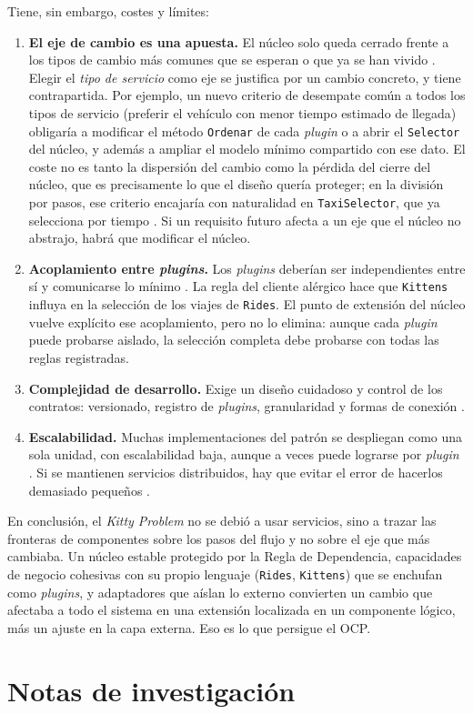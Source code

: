Tiene, sin embargo, costes y límites:
\begin{enumerate}[label=(\arabic*)]
  \item \textbf{El eje de cambio es una apuesta.} El núcleo solo queda cerrado frente a
        los tipos de cambio más comunes que se esperan o que ya se han vivido
        \parencite[106]{martin2017}. Elegir el \emph{tipo de servicio} como eje se justifica
        por un cambio concreto, y tiene contrapartida. Por ejemplo, un nuevo criterio de
        desempate común a todos los tipos de servicio (preferir el vehículo con menor
        tiempo estimado de llegada) obligaría a modificar el método \texttt{Ordenar} de
        cada \emph{plugin} o a abrir el \texttt{Selector} del núcleo, y además a ampliar
        el modelo mínimo compartido con ese dato. El coste no es tanto la dispersión del
        cambio como la pérdida del cierre del núcleo, que es precisamente lo que el
        diseño quería proteger; en la división por pasos, ese criterio encajaría con
        naturalidad en \texttt{TaxiSelector}, que ya selecciona por tiempo
        \parencite[242]{martin2017}. Si un requisito futuro afecta a un eje que el núcleo
        no abstrajo, habrá que modificar el núcleo.
  \item \textbf{Acoplamiento entre \emph{plugins}.} Los \emph{plugins} deberían ser
        independientes entre sí y comunicarse lo mínimo \parencite[22]{richards2015}. La
        regla del cliente alérgico hace que \texttt{Kittens} influya en la selección de
        los viajes de \texttt{Rides}. El punto de extensión del núcleo vuelve explícito
        ese acoplamiento, pero no lo elimina: aunque cada \emph{plugin} puede probarse
        aislado, la selección completa debe probarse con todas las reglas registradas.
  \item \textbf{Complejidad de desarrollo.} Exige un diseño cuidadoso y control de los
        contratos: versionado, registro de \emph{plugins}, granularidad y formas de
        conexión \parencite[26]{richards2015}.
  \item \textbf{Escalabilidad.} Muchas implementaciones del patrón se despliegan como una
        sola unidad, con escalabilidad baja, aunque a veces puede lograrse por
        \emph{plugin} \parencite[26]{richards2015}. Si se mantienen servicios
        distribuidos, hay que evitar el error de hacerlos demasiado pequeños
        \parencite[cap.~17]{richardsford2020}.
\end{enumerate}

En conclusión, el \emph{Kitty Problem} no se debió a usar servicios, sino a trazar las
fronteras de componentes sobre los pasos del flujo y no sobre el eje que más cambiaba. Un
núcleo estable protegido por la Regla de Dependencia, capacidades de negocio cohesivas
con su propio lenguaje (\texttt{Rides}, \texttt{Kittens}) que se enchufan como
\emph{plugins}, y adaptadores que aíslan lo externo convierten un cambio que afectaba a
todo el sistema en una extensión localizada en un componente lógico, más un ajuste en la
capa externa. Eso es lo que persigue el OCP.



\section*{Notas de investigación}

\endgroup
